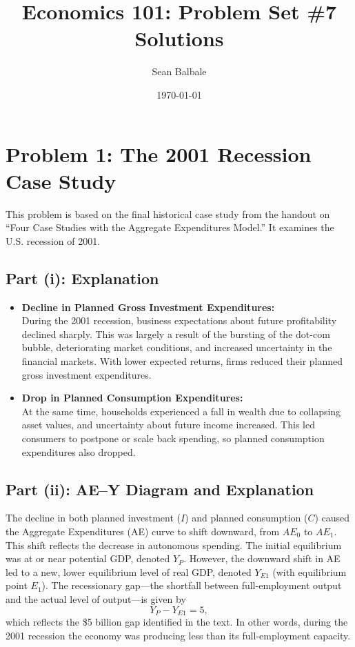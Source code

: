 \documentclass{article}
\title{Economics 101: Problem Set \#7 Solutions}
\author{Sean Balbale}
\date{\today}
\begin{document}
\maketitle

\section*{Problem 1: The 2001 Recession Case Study}
This problem is based on the final historical case study from the handout on ``Four Case Studies with the Aggregate Expenditures Model.'' It examines the U.S. recession of 2001.

\subsection*{Part (i): Explanation}
\begin{itemize}
  \item \textbf{Decline in Planned Gross Investment Expenditures:}\\
  During the 2001 recession, business expectations about future profitability declined sharply. This was largely a result of the bursting of the dot-com bubble, deteriorating market conditions, and increased uncertainty in the financial markets. With lower expected returns, firms reduced their planned gross investment expenditures.
  
  \item \textbf{Drop in Planned Consumption Expenditures:}\\
  At the same time, households experienced a fall in wealth due to collapsing asset values, and uncertainty about future income increased. This led consumers to postpone or scale back spending, so planned consumption expenditures also dropped.
\end{itemize}

\subsection*{Part (ii): AE--Y Diagram and Explanation}
The decline in both planned investment (\(I\)) and planned consumption (\(C\)) caused the Aggregate Expenditures (AE) curve to shift downward, from \(AE_0\) to \(AE_1\). This shift reflects the decrease in autonomous spending. The initial equilibrium was at or near potential GDP, denoted \(Y_P\). However, the downward shift in AE led to a new, lower equilibrium level of real GDP, denoted \(Y_{E1}\) (with equilibrium point \(E_1\)). The recessionary gap—the shortfall between full-employment output and the actual level of output—is given by 
\[
Y_P - Y_{E1} = 5,
\]
which reflects the \$5 billion gap identified in the text. In other words, during the 2001 recession the economy was producing less than its full-employment capacity.
\end{document}
